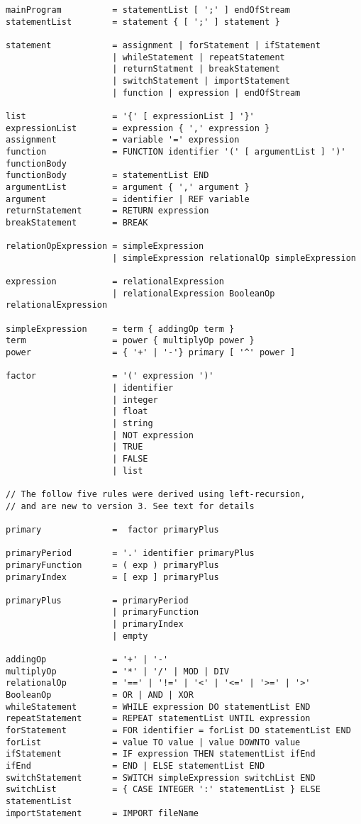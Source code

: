 \footnotesize\begin{verbatim}
mainProgram          = statementList [ ';' ] endOfStream
statementList        = statement { [ ';' ] statement }

statement            = assignment | forStatement | ifStatement
                     | whileStatement | repeatStatement
                     | returnStatment | breakStatement
                     | switchStatement | importStatement
                     | function | expression | endOfStream

list                 = '{' [ expressionList ] '}'
expressionList       = expression { ',' expression }
assignment           = variable '=' expression
function             = FUNCTION identifier '(' [ argumentList ] ')' functionBody
functionBody         = statementList END
argumentList         = argument { ',' argument }
argument             = identifier | REF variable
returnStatement      = RETURN expression
breakStatement       = BREAK

relationOpExpression = simpleExpression
                     | simpleExpression relationalOp simpleExpression

expression           = relationalExpression
                     | relationalExpression BooleanOp relationalExpression

simpleExpression     = term { addingOp term }
term                 = power { multiplyOp power }
power                = { '+' | '-'} primary [ '^' power ]

factor               = '(' expression ')'
                     | identifier
                     | integer
                     | float
                     | string
                     | NOT expression
                     | TRUE
                     | FALSE
                     | list

// The follow five rules were derived using left-recursion,
// and are new to version 3. See text for details

primary              =  factor primaryPlus

primaryPeriod        = '.' identifier primaryPlus
primaryFunction      = ( exp ) primaryPlus
primaryIndex         = [ exp ] primaryPlus

primaryPlus          = primaryPeriod
                     | primaryFunction
                     | primaryIndex
                     | empty

addingOp             = '+' | '-'
multiplyOp           = '*' | '/' | MOD | DIV
relationalOp         = '==' | '!=' | '<' | '<=' | '>=' | '>'
BooleanOp            = OR | AND | XOR
whileStatement       = WHILE expression DO statementList END
repeatStatement      = REPEAT statementList UNTIL expression
forStatement         = FOR identifier = forList DO statementList END
forList              = value TO value | value DOWNTO value
ifStatement          = IF expression THEN statementList ifEnd
ifEnd                = END | ELSE statementList END
switchStatement      = SWITCH simpleExpression switchList END
switchList           = { CASE INTEGER ':' statementList } ELSE statementList
importStatement      = IMPORT fileName
\end{verbatim}
\normalsize


